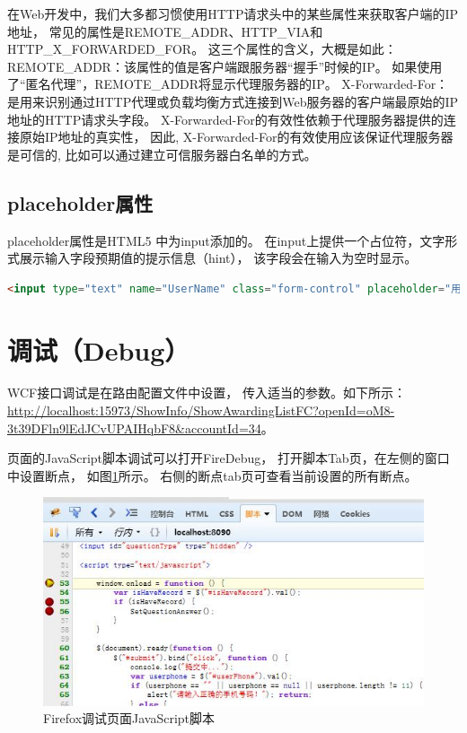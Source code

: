 \documentclass{book}
\begin{document}
在Web开发中，我们大多都习惯使用HTTP请求头中的某些属性来获取客户端的IP地址，
常见的属性是REMOTE\_ADDR、HTTP\_VIA和HTTP\_X\_FORWARDED\_FOR。
这三个属性的含义，大概是如此：REMOTE\_ADDR：该属性的值是客户端跟服务器“握手”时候的IP。
如果使用了“匿名代理”，REMOTE\_ADDR将显示代理服务器的IP。
X-Forwarded-For：
是用来识别通过HTTP代理或负载均衡方式连接到Web服务器的客户端最原始的IP地址的HTTP请求头字段。
X-Forwarded-For的有效性依赖于代理服务器提供的连接原始IP地址的真实性，
因此, X-Forwarded-For的有效使用应该保证代理服务器是可信的, 
比如可以通过建立可信服务器白名单的方式。

\subsection{placeholder属性}

placeholder属性是HTML5 中为input添加的。
在input上提供一个占位符，文字形式展示输入字段预期值的提示信息（hint），
该字段会在输入为空时显示。

\begin{lstlisting}[language=HTML]
<input type="text" name="UserName" class="form-control" placeholder="用户唯一ID"/>
\end{lstlisting}

\section{调试（Debug）}

WCF接口调试是在路由配置文件中设置，
传入适当的参数。如下所示：
\url{http://localhost:15973/ShowInfo/ShowAwardingListFC?openId=oM8-3t39DFln9lEdJCvUPAIHqbF8&accountId=34}。

页面的JavaScript脚本调试可以打开FireDebug，
打开脚本Tab页，在左侧的窗口中设置断点，
如图\ref{fig:FirefoxDebugPage}所示。
右侧的断点tab页可查看当前设置的所有断点。

\begin{figure}[htbp]
	\centering
	\includegraphics[scale=0.8]{FirefoxDebugPage.jpg}
	\caption{Firefox调试页面JavaScript脚本}
	\label{fig:FirefoxDebugPage}
\end{figure}
\end{document}
